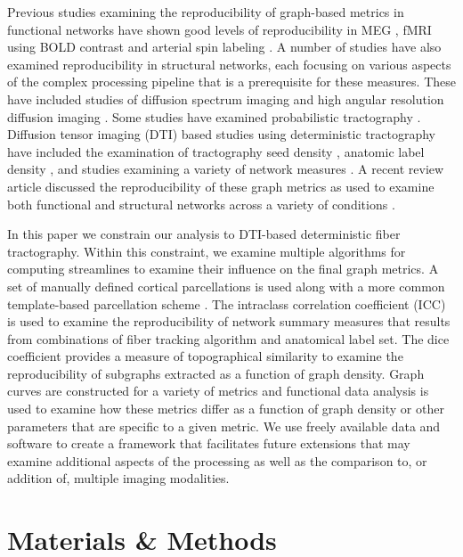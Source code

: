 \documentclass{frontiersSCNS} %
\begin{document}
Previous studies examining the reproducibility of graph-based metrics in
functional networks have shown good levels of reproducibility in MEG
\citep{Deuker2009}, fMRI using BOLD contrast
\citep{Telesford2010,Braun2012,Schwarz2011,Liang2012,Weber2013} and
arterial spin labeling \citep{Weber2013}. A number of studies have also examined
reproducibility in structural networks, each focusing on various aspects
of the complex processing pipeline that is a prerequisite for these
measures. These have included studies of diffusion spectrum imaging
\citep{Cammoun2012,Bassett2011N} and high angular resolution diffusion
imaging \citep{Dennis2012}. Some studies have examined probabilistic
tractography \citep{Owen2013BC,Vaessen2010}. Diffusion tensor imaging (DTI) based studies using
deterministic tractography have included the examination of
tractography seed density \citep{Cheng2012N}, anatomic label density
\citep{Bassett2011N}, and studies examining a variety of network
measures \citep{Cheng2012N,Irimia2012N}. A recent review article discussed the 
reproducibility of these graph metrics as used to examine both functional 
and structural networks across a variety of conditions \citep{Telesford2013}.

In this paper we constrain our analysis to DTI-based deterministic fiber
tractography. Within this constraint, we examine multiple algorithms
for computing streamlines to examine their influence on the final graph metrics. A set of manually defined
cortical parcellations \citep{Klein2012} is used along with a more common template-based
parcellation scheme \citep{Tzourio-Mazoyer2002}. The intraclass correlation coefficient (ICC) is used to 
examine the reproducibility of network summary measures that results from combinations
of fiber tracking algorithm and anatomical label set. The dice coefficient provides a measure
of topographical similarity to examine the reproducibility of subgraphs extracted as a
function of graph density. Graph curves are constructed for a variety of metrics and functional data analysis is used
to examine how these metrics differ as a function of graph density or other parameters
that are specific to a given metric. We use freely
available data and software to create a framework that facilitates future extensions
that may examine additional aspects of the processing as well as the
comparison to, or addition of, multiple imaging modalities. 

\section{Materials \& Methods}
\end{document}
